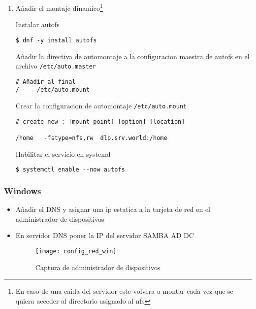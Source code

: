 \documentclass[../main.tex]{subfiles}
\begin{document}
\begin{enumerate}
  \item Añadir el montaje dinamico\footnote{En caso de una caida
        del servidor este volvera a montar cada vez que se
        quiera acceder al directorio asignado al \Gls{nfs}}

        Instalar \Gls{autofs}
        \begin{listing}[H]
\begin{verbatim}
$ dnf -y install autofs
\end{verbatim}
        \end{listing}
        Añadir la directiva de automontaje a la configuracion maestra de
        \gls{autofs} en el archivo \texttt{/etc/auto.master}

        \begin{listing}[H]
\begin{verbatim}
# Añadir al final
/-    /etc/auto.mount
\end{verbatim}
        \end{listing}

        Crear la configuracion de automontaje \texttt{/etc/auto.mount}
        \begin{listing}[H]
\begin{verbatim}
# create new : [mount point] [option] [location]

/home   -fstype=nfs,rw  dlp.srv.world:/home
\end{verbatim}
        \end{listing}

        Habilitar el servicio en \gls{systemd}
        \begin{listing}[H]
\begin{verbatim}
$ systemctl enable --now autofs
\end{verbatim}
        \end{listing}

\end{enumerate}


\newpage{}



\subsubsection{Windows}\label{sec:cliente_win}

\begin{itemize}
  \item Añadir el DNS y asignar una ip estatica a la tarjeta de red en el administrador de dispositivos
  \item En servidor DNS poner la IP del servidor SAMBA AD DC
        \begin{figure}[H]
          \centering
          \texttt{[image: config\_red\_win]}
          \caption{Captura de administrador de dispositivos}\label{fig:confrwin}
        \end{figure}

\end{itemize}
\end{document}
